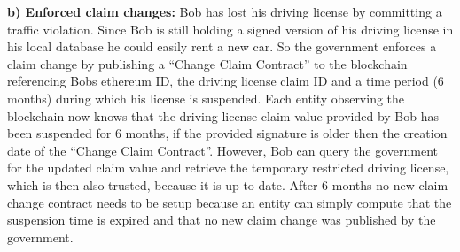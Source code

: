 \textbf{b) Enforced claim changes:}
Bob has lost his driving license by committing a traffic violation. Since Bob is still holding a signed version of his driving license in his local database he could easily rent a new car. So the government enforces a claim change by publishing a “Change Claim Contract” to the blockchain referencing Bobs ethereum ID, the driving license claim ID and a time period (6 months) during which his license is suspended. Each entity observing the blockchain now knows that the driving license claim value provided by Bob has been suspended for 6 months, if the provided signature is older then the creation date of the “Change Claim Contract”. However, Bob can query the government for the updated claim value and retrieve the temporary restricted driving license, which is then also trusted, because it is up to date. After 6 months no new claim change contract needs to be setup because an entity can simply compute that the suspension time is expired and that no new claim change was published by the government.
